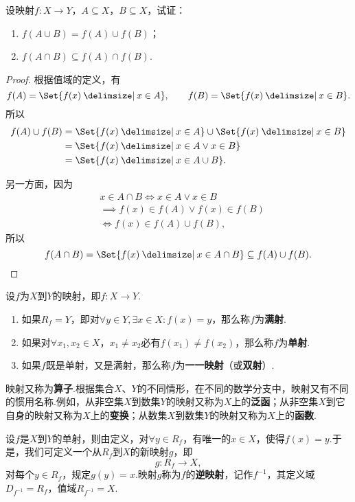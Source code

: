 \begin{example}
设映射\(f\colon X \to Y\)，\(A \subseteq X\)，\(B \subseteq X\)，试证：\begin{enumerate}
\item \(f(A \cup B) = f(A) \cup f(B)\)；
\item \(f(A \cap B) \subseteq f(A) \cap f(B)\).
\end{enumerate}
\begin{proof}
\def\fran#1{ \Set{ f(x) \given #1 } }
根据值域的定义，有\[
f(A) = \fran{x \in A},
\qquad
f(B) = \fran{x \in B}.
\]所以\[
\begin{split}
f(A) \cup f(B)
&= \fran{x \in A} \cup \fran{x \in B} \\
&= \fran{x \in A \lor x \in B} \\
&= \fran{x \in A \cup B}.
\end{split}
\]

另一方面，因为\[
\begin{split}
&x \in A \cap B
\iff
x \in A \lor x \in B \\
&\implies
f(x) \in f(A) \lor f(x) \in f(B) \\
&\iff
f(x) \in f(A) \cup f(B),
\end{split}
\]所以\[
f(A \cap B) = \fran{x \in A \cap B}
\subseteq f(A) \cup f(B).
\qedhere
\]
\end{proof}
\end{example}

\begin{definition}
设\(f\)为\(X\)到\(Y\)的映射，即\(f\colon X \to Y\).
\begin{enumerate}
\item 如果\(R_f = Y\)，即对\(\forall y \in Y, \exists x \in X: f(x) = y\)，那么称\(f\)为\textbf{满射}.
\item 如果对\(\forall x_1, x_2 \in X\)，\(x_1 \neq x_2\)必有\(f(x_1) \neq f(x_2)\)，那么称\(f\)为\textbf{单射}.
\item 如果\(f\)既是单射，又是满射，那么称\(f\)为\textbf{一一映射}（或\textbf{双射}）.
\end{enumerate}

映射又称为\textbf{算子}.根据集合\(X\)、\(Y\)的不同情形，在不同的数学分支中，映射又有不同的惯用名称.例如，从非空集\(X\)到数集\(Y\)的映射又称为\(X\)上的\textbf{泛函}；从非空集\(X\)到它自身的映射又称为\(X\)上的\textbf{变换}；从数集\(X\)到数集\(Y\)的映射又称为\(X\)上的\textbf{函数}.
\end{definition}

\begin{definition}
设\(f\)是\(X\)到\(Y\)的单射，则由定义，对\(\forall y \in R_f\)，有唯一的\(x \in X\)，使得\(f(x) = y\).于是，我们可定义一个从\(R_f\)到\(X\)的新映射\(g\)，即\[
g: R_f \to X,
\]对每个\(y \in R_f\)，规定\(g(y) = x\).映射\(g\)称为\(f\)的\textbf{逆映射}，记作\(f^{-1}\)，其定义域\(D_{f^{-1}} = R_f\)，值域\(R_{f^{-1}} = X\).
\end{definition}

